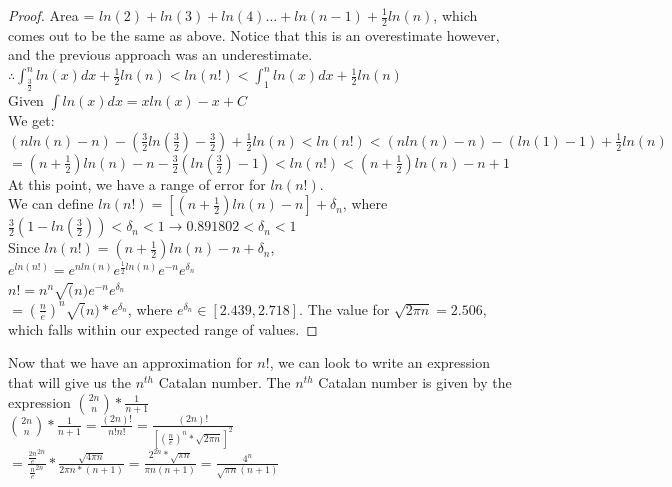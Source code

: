 \begin{proof}
Area = $ln(2)+ln(3)+ln(4)\dots+ln(n-1)+\frac{1}{2}ln(n)$, which comes out to be the same as above.  Notice that this is an overestimate however, and the previous approach was an underestimate.\\
$\therefore \int_{\frac{3}{2}}^{n}{ln(x)}dx + \frac{1}{2}ln(n) < ln(n!) < \int_{1}^{n}{ln(x)}dx + \frac{1}{2}ln(n)$\\

Given $\int{ln(x)}dx = xln(x) - x + C$\\

We get:\\
$(nln(n)-n)-(\frac{3}{2}ln(\frac{3}{2}) - \frac{3}{2}) + \frac{1}{2}ln(n) < ln(n!) < (nln(n) - n) - (ln(1) - 1) + \frac{1}{2}ln(n)$\\
$=(n+\frac{1}{2})ln(n)-n-\frac{3}{2}(ln(\frac{3}{2}) - 1) < ln(n!) < (n+\frac{1}{2})ln(n) - n + 1$\\

At this point, we have a range of error for $ln(n!)$.\\

We can define $ln(n!) = [(n+\frac{1}{2})ln(n) - n] + \delta_n$, where $\frac{3}{2}(1-ln(\frac{3}{2})) < \delta_n < 1 \longrightarrow 0.891802 < \delta_n < 1$\\

Since $ln(n!) = (n+\frac{1}{2})ln(n) - n + \delta_n$,\\
$e^{ln(n!)} = e^{nln(n)}e^{\frac{1}{2}ln(n)}e^{-n}e^{\delta_n}$\\
$n! = n^n \sqrt(n) e^{-n}e^{\delta_n}$\\
$=(\frac{n}{e})^n \sqrt(n) * e^{\delta_n}$, where $e^{\delta_n} \in [2.439, 2.718]$. The value for $\sqrt{2 \pi n} = 2.506$, which falls within our expected range of values.

\end{proof}

Now that we have an approximation for $n!$, we can look to write an expression that will give us the $n^{th}$ Catalan number. The $n^{th}$ Catalan number is given by the expression $\binom {2n} n*\frac{1}{n+1}$\\
$\binom{2n}n*\frac{1}{n+1} = \frac{(2n)!}{n!n!} = \frac{(2n)!}{[(\frac{n}{e})^n * \sqrt{2\pi n}]^2}$\\
$= \frac{\frac{2n}{e}^{2n}}{\frac{n}{e}^{2n}} * \frac{\sqrt{4\pi n}}{2\pi n * (n+1)} = \frac{2^{2n}*\sqrt{\pi n}}{\pi n(n+1)} = \frac{4^n}{\sqrt{\pi n}(n+1)}$

